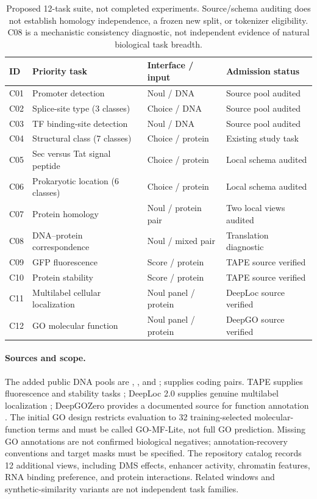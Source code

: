 \begin{table}[ht]
\centering\small
\begin{tabular}{p{.08\linewidth}p{.36\linewidth}p{.19\linewidth}p{.26\linewidth}}
\toprule
ID & Priority task & Interface / input & Admission status \\
\midrule
C01 & Promoter detection & Noul / DNA & Source pool audited \\
C02 & Splice-site type (3 classes) & Choice / DNA & Source pool audited \\
C03 & TF binding-site detection & Noul / DNA & Source pool audited \\
C04 & Structural class (7 classes) & Choice / protein & Existing study task \\
C05 & Sec versus Tat signal peptide & Choice / protein & Local schema audited \\
C06 & Prokaryotic location (6 classes) & Choice / protein & Local schema audited \\
C07 & Protein homology & Noul / protein pair & Two local views audited \\
C08 & DNA--protein correspondence & Noul / mixed pair & Translation diagnostic \\
C09 & GFP fluorescence & Score / protein & TAPE source verified \\
C10 & Protein stability & Score / protein & TAPE source verified \\
C11 & Multilabel cellular localization & Noul panel / protein & DeepLoc source verified \\
C12 & GO molecular function & Noul panel / protein & DeepGO source verified \\
\bottomrule
\end{tabular}
\caption{Proposed 12-task suite, not completed experiments. Source/schema auditing does not establish homology independence, a frozen new split, or tokenizer eligibility. C08 is a mechanistic consistency diagnostic, not independent evidence of natural biological task breadth.}
\label{tab:planned_tasks}
\end{table}

\paragraph{Sources and scope.}
The added public DNA pools are , , and ;  supplies coding pairs. TAPE supplies fluorescence and stability tasks \citep{rao2019tape}; DeepLoc 2.0 supplies genuine multilabel localization \citep{thumuluri2022deeploc}; DeepGOZero provides a documented source for function annotation \citep{kulmanov2022deepgozero}. The initial GO design restricts evaluation to 32 training-selected molecular-function terms and must be called GO-MF-Lite, not full GO prediction. Missing GO annotations are not confirmed biological negatives; annotation-recovery conventions and target masks must be specified. The repository catalog records 12 additional views, including DMS effects, enhancer activity, chromatin features, RNA binding preference, and protein interactions. Related windows and synthetic-similarity variants are not independent task families.

